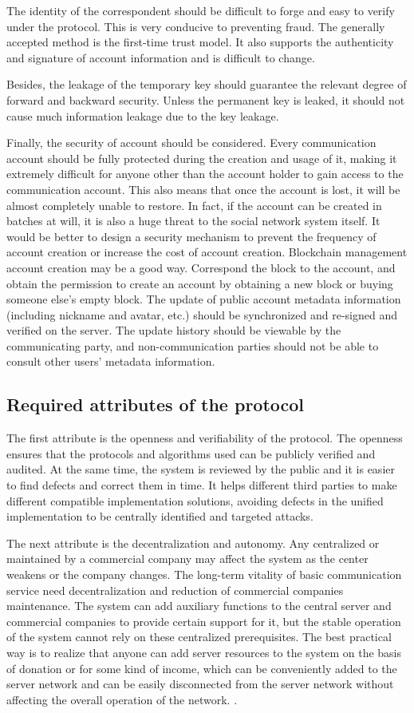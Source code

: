 \documentclass[11pt,en]{elegantpaper}
\begin{document}
The identity of the correspondent should be difficult to forge and easy to verify under the protocol. This is very conducive to preventing fraud. The generally accepted method is the first-time trust model. It also supports the authenticity and signature of account information and is difficult to change.

Besides, the leakage of the temporary key should guarantee the relevant degree of forward and backward security. Unless the permanent key is leaked, it should not cause much information leakage due to the key leakage.

Finally, the security of account should be considered. Every communication account should be fully protected during the creation and usage of it, making it extremely difficult for anyone other than the account holder to gain access to the communication account. This also means that once the account is lost, it will be almost completely unable to restore. In fact, if the account can be created in batches at will, it is also a huge threat to the social network system itself. It would be better to design a security mechanism to prevent the frequency of account creation or increase the cost of account creation. Blockchain management account creation may be a good way. Correspond the block to the account, and obtain the permission to create an account by obtaining a new block or buying someone else's empty block. The update of public account metadata information (including nickname and avatar, etc.) should be synchronized and re-signed and verified on the server. The update history should be viewable by the communicating party, and non-communication parties should not be able to consult other users' metadata information.

\subsection{Required attributes of the protocol}
The first attribute is the openness and verifiability of the protocol. The openness ensures that the protocols and algorithms used can be publicly verified and audited. At the same time, the system is reviewed by the public and it is easier to find defects and correct them in time. It helps different third parties to make different compatible implementation solutions, avoiding defects in the unified implementation to be centrally identified and targeted attacks.

The next attribute is the decentralization and autonomy. Any centralized or maintained by a commercial company may affect the system as the center weakens or the company changes. The long-term vitality of basic communication service need decentralization and reduction of commercial companies maintenance. The system can add auxiliary functions to the central server and commercial companies to provide certain support for it, but the stable operation of the system cannot rely on these centralized prerequisites. The best practical way is to realize that anyone can add server resources to the system on the basis of donation or for some kind of income, which can be conveniently added to the server network and can be easily disconnected from the server network without affecting the overall operation of the network. .
\end{document}
